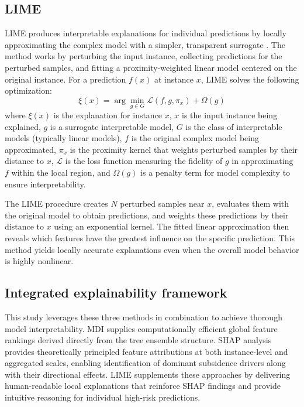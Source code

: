 \documentclass[oneside,doublespacing,flushright]{lsuthesis}
\begin{document}
\subsection{LIME}
LIME produces interpretable explanations for individual predictions by locally approximating the complex model with a simpler, transparent surrogate \citep{Ribeiro2016}. The method works by perturbing the input instance, collecting predictions for the perturbed samples, and fitting a proximity-weighted linear model centered on the original instance. For a prediction $f(x)$ at instance $x$, LIME solves the following optimization:
\begin{equation}
\xi(x) = \arg\min_{g \in G} \mathcal{L}(f, g, \pi_x) + \Omega(g)
\end{equation}
where $\xi(x)$ is the explanation for instance $x$, $x$ is the input instance being explained, $g$ is a surrogate interpretable model, $G$ is the class of interpretable models (typically linear models), $f$ is the original complex model being approximated, $\pi_x$ is the proximity kernel that weights perturbed samples by their distance to $x$, $\mathcal{L}$ is the loss function measuring the fidelity of $g$ in approximating $f$ within the local region, and $\Omega(g)$ is a penalty term for model complexity to ensure interpretability.

The LIME procedure creates $N$ perturbed samples near $x$, evaluates them with the original model to obtain predictions, and weights these predictions by their distance to $x$ using an exponential kernel. The fitted linear approximation then reveals which features have the greatest influence on the specific prediction. This method yields locally accurate explanations even when the overall model behavior is highly nonlinear.

\subsection{Integrated explainability framework}
This study leverages these three methods in combination to achieve thorough model interpretability. MDI supplies computationally efficient global feature rankings derived directly from the tree ensemble structure. 
SHAP analysis provides theoretically principled feature attributions at both instance-level and aggregated scales, enabling identification of dominant subsidence drivers along with their directional effects. 
LIME supplements these approaches by delivering human-readable local explanations that reinforce SHAP findings and provide intuitive reasoning for individual high-risk predictions.
\end{document}
